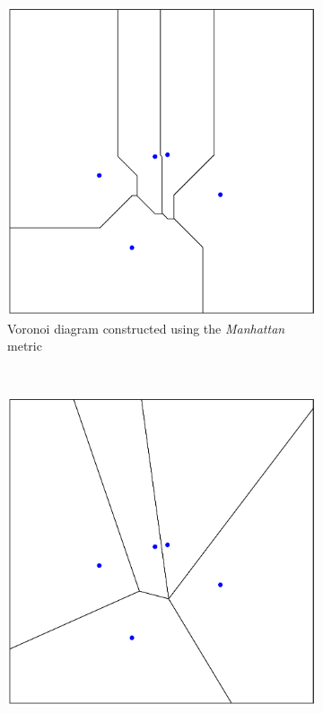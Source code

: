 \documentclass[preprint, 12pt]{elsarticle}
\begin{document}
\begin{figure}
	\caption{Example of Voronoi diagram with five seeds (firms). The solid lines are the boundaries of the Voronoi set (boundaries of market).}
	\centering
	\begin{subfigure}[b]{0.315\textwidth}
		\includegraphics[width=\textwidth]{Graphics/Voronoi_manhattan.pdf}
		\caption{Voronoi diagram constructed using the \emph{Manhattan} metric}
		\label{fig:manhattan}
	\end{subfigure}
	~
	\begin{subfigure}[b]{0.315\textwidth}
		\includegraphics[width=\textwidth]{Graphics/Voronoi_euclidean.pdf}

\end{subfigure}
\end{figure}
\end{document}
